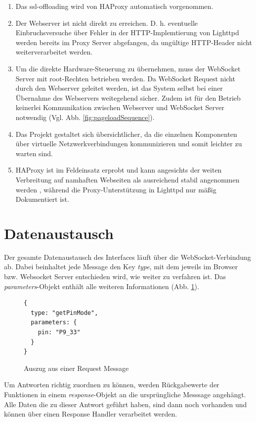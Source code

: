 \begin{enumerate}
  \item Das \gls{ssl-offloading} wird von HAProxy automatisch vorgenommen.
  \item Der Webserver ist nicht direkt zu erreichen. D. h. eventuelle Einbruchsversuche über Fehler in der HTTP-Implemtierung von Lighttpd werden bereits im Proxy Server abgefangen, da ungültige HTTP-Header nicht weiterverarbeitet werden.
  \item Um die direkte Hardware-Steuerung zu übernehmen, muss der WebSocket Server mit root-Rechten betrieben werden. Da WebSocket Request nicht durch den Webserver geleitet werden, ist das System selbst bei einer Übernahme des Webservers weitegehend sicher. Zudem ist für den Betrieb keinerlei Kommunikation zwischen Webserver und WebSocket Server notwendig (Vgl. Abb. \ref{fig:pageloadSequence}).
  \item Das Projekt gestaltet sich übersichtlicher, da die einzelnen Komponenten über virtuelle Netzwerkverbindungen kommunizieren und somit leichter zu warten sind.   
  \item HAProxy ist im Feldeinsatz erprobt und kann angesichts der weiten Verbreitung auf namhaften Webseiten als ausreichend stabil angenommen werden \cite{kuehnast2014}, während die Proxy-Unterstützung in Lighttpd nur mäßig Dokumentiert ist.
\end{enumerate}


\section{Datenaustausch}
Der gesamte Datenaustausch des Interfaces läuft über die WebSocket-Verbindung ab. Dabei beinhaltet jede Message den Key \textit{type}, mit dem jeweils im Browser bzw. Websocket Server entschieden wird, wie weiter zu verfahren ist. Das \textit{parameters}-Objekt enthält alle weiteren Informationen (Abb. \ref{lst:requestMessage}).\\

\begin{figure}[ht]
\begin{lstlisting}
{
  type: "getPinMode",
  parameters: {
    pin: "P9_33"
  }
}
\end{lstlisting}
\caption{Auszug aus einer Request Message}
\label{lst:requestMessage}
\end{figure}

Um Antworten richtig zuordnen zu können, werden Rückgabewerte der Funktionen in einem \textit{response}-Objekt an die ursprüngliche Messsage angehängt. Alle Daten die zu dieser Antwort geführt haben, sind dann noch vorhanden und können über einen Response Handler verarbeitet werden.\\

